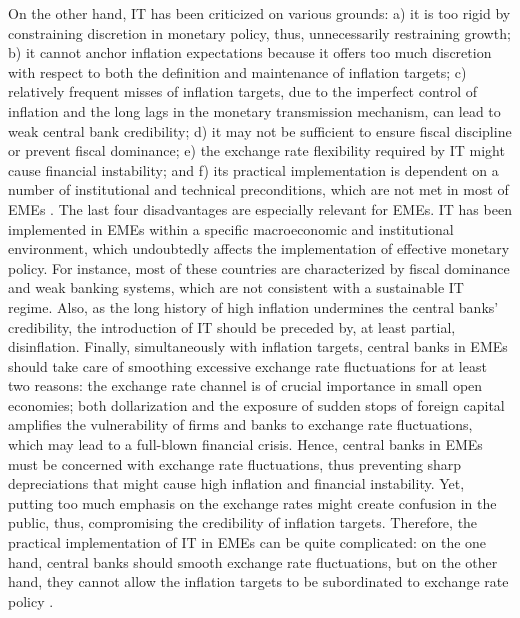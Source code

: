 \documentclass{article}
\begin{document}
On the other hand, IT has been criticized on various grounds: a) it is too rigid by constraining discretion in monetary policy, thus, unnecessarily restraining growth; b) it cannot anchor inflation expectations because it offers too much discretion with respect to both the definition and maintenance of inflation targets; c) relatively frequent misses of inflation targets, due to the imperfect control of inflation and the long lags in the monetary transmission mechanism, can lead to weak central bank credibility; d) it may not be sufficient to ensure fiscal discipline or prevent fiscal dominance; e) the exchange rate flexibility required by IT might cause financial instability; and f) its practical implementation is dependent on a number of institutional and technical preconditions, which are not met in most of EMEs \citep{Batini2007, Bernanke1999, Mishkin1999, Mishkin2000}. The last four disadvantages are especially relevant for EMEs. IT has been implemented in EMEs within a specific macroeconomic and institutional environment, which undoubtedly affects the implementation of effective monetary policy. For instance, most of these countries are characterized by fiscal dominance and weak banking systems, which are not consistent with a sustainable IT regime. Also, as the long history of high inflation undermines the central banks’ credibility, the introduction of IT should be preceded by, at least partial, disinflation. Finally, simultaneously with inflation targets, central banks in EMEs should take care of smoothing excessive exchange rate fluctuations for at least two reasons: the exchange rate channel is of crucial importance in small open economies; both dollarization and the exposure of sudden stops of foreign capital amplifies the vulnerability of firms and banks to exchange rate fluctuations, which may lead to a full-blown financial crisis. Hence, central banks in EMEs must be concerned with exchange rate fluctuations, thus preventing sharp depreciations that might cause high inflation and financial instability. Yet, putting too much emphasis on the exchange rates might create confusion in the public, thus, compromising the credibility of inflation targets. Therefore, the practical implementation of IT in EMEs can be quite complicated: on the one hand, central banks should smooth exchange rate fluctuations, but on the other hand, they cannot allow the inflation targets to be subordinated to exchange rate policy \citep{Agenor2002, Buffie2018, Aizenman2010, Carrare2002, Cespedes2014, Civcir2010, Edwards2007, Eichengreen1999, Ho2003, Kumhof2007, Leiderman2006, Jonas2007, Mishkin2000, Mishkin2004b, Mishkin2002, Parrado2004, Roger2009, Schaechter2000, Schmidt-Hebbel2002, Siregar2010, Stone2009}.
\end{document}
